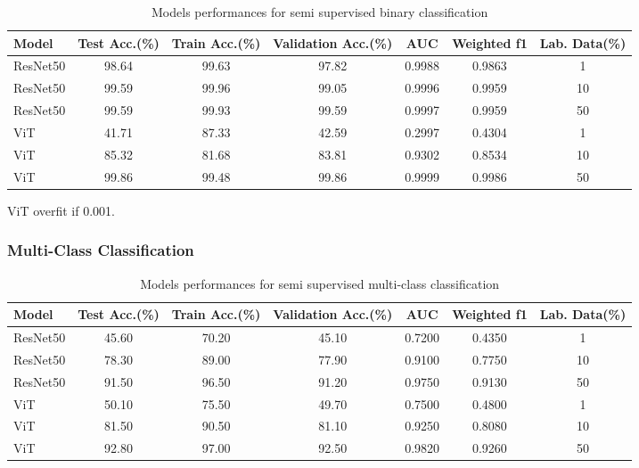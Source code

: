 \documentclass{article}
\begin{document}
\renewcommand{\arraystretch}{1.1} 
\begin{table}[H] %
    \centering %
    \caption{Models performances for semi supervised binary classification} %
    \label{tab:semi_binary_perf} %
    \begin{tabular}{|l|c|c|c|c|c|c|}
        \hline
        Model & Test Acc.(\%) & Train Acc.(\%) & Validation Acc.(\%) & AUC & Weighted f1 & Lab. Data(\%) \\
        \hline
        ResNet50 & 98.64 & 99.63 & 97.82 & 0.9988 & 0.9863 & 1 \\
        ResNet50 & 99.59 & 99.96 & 99.05 & 0.9996 & 0.9959 & 10 \\ 
        ResNet50 & 99.59 & 99.93 & 99.59 & 0.9997 & 0.9959 & 50 \\ 
        ViT & 41.71 & 87.33 & 42.59 & 0.2997 & 0.4304 & 1 \\
        ViT & 85.32 & 81.68 & 83.81 & 0.9302 & 0.8534 & 10 \\
        ViT & 99.86 & 99.48 & 99.86 & 0.9999 & 0.9986 & 50 \\
        \hline
    \end{tabular}
\end{table}

ViT overfit if 0.001.

\subsubsection{Multi-Class Classification}

\renewcommand{\arraystretch}{1.1}
\begin{table}[H] %
\centering %
\caption{Models performances for semi supervised multi-class classification} %
\label{tab:semi_multi_perf} %
\begin{tabular}{|l|c|c|c|c|c|c|}
\hline
        Model & Test Acc.(\%) & Train Acc.(\%) & Validation Acc.(\%) & AUC & Weighted f1 & Lab. Data(\%) \\
\hline
ResNet50 & 45.60 & 70.20 & 45.10 & 0.7200 & 0.4350 & 1 \\ %
ResNet50 & 78.30 & 89.00 & 77.90 & 0.9100 & 0.7750 & 10 \\ %
ResNet50 & 91.50 & 96.50 & 91.20 & 0.9750 & 0.9130 & 50 \\ %
ViT & 50.10 & 75.50 & 49.70 & 0.7500 & 0.4800 & 1 \\ %
ViT & 81.50 & 90.50 & 81.10 & 0.9250 & 0.8080 & 10 \\ %
ViT & 92.80 & 97.00 & 92.50 & 0.9820 & 0.9260 & 50 \\ %
\hline
\end{tabular}
\end{table}
\end{document}
